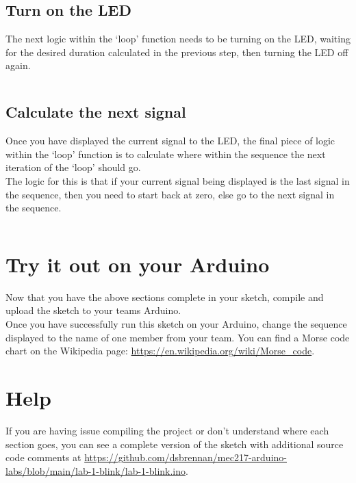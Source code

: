 \documentclass[11pt,a4paper]{article}
\begin{document}
\inputminted{arduino}{./src/3-calculate-duration.txt}

\subsection{Turn on the LED}
\label{sec:led}
The next logic within the `loop' function needs to be turning on the LED, waiting for the desired duration calculated in the previous step, then turning the LED off again.

\inputminted{arduino}{./src/4-flash-led.txt}

\subsection{Calculate the next signal}
\label{sec:next}
Once you have displayed the current signal to the LED, the final piece of logic within the `loop' function is to calculate where within the sequence the next iteration of the `loop' should go.\\

\noindent
The logic for this is that if your current signal being displayed is the last signal in the sequence, then you need to start back at zero, else go to the next signal in the sequence.

\inputminted{arduino}{./src/5-next-sequence.txt}

\section{Try it out on your Arduino}
Now that you have the above sections complete in your sketch, compile and upload the sketch to your teams Arduino.\\ 

\noindent
Once you have successfully run this sketch on your Arduino, change the sequence displayed to the name of one member from your team. You can find a Morse code chart on the Wikipedia page: \url{https://en.wikipedia.org/wiki/Morse_code}.

\section*{Help}
If you are having issue compiling the project or don't understand where each section goes, you can see a complete version of the sketch with additional source code comments at \url{https://github.com/dsbrennan/mec217-arduino-labs/blob/main/lab-1-blink/lab-1-blink.ino}.

\vspace{2em}

\begin{center}
\end{center}
\end{document}
